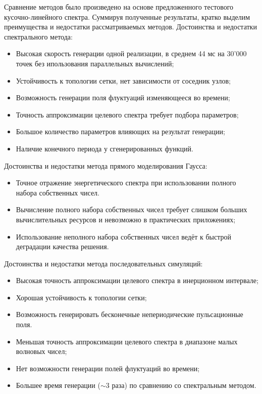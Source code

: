 Сравнение методов было произведено на основе предложенного тестового кусочно-линейного спектра.
Суммируя полученные результаты, кратко выделим преимущества и недостатки рассматриваемых методов.
\newline
Достоинства и недостатки спектрального метода:
\begin{itemize}[label=+]
    \item Высокая скорость генерации одной реализации, в среднем 44 мс на 30'000 точек без ипользования параллельных вычислений;
    \item Устойчивость к топологии сетки, нет зависимости от соседник узлов;
    \item Возможность генерации поля флуктуаций изменяющееся во времени;
\end{itemize}
\begin{itemize}[label=--]
    \item Точность аппроксимации целевого спектра требует подбора параметров;
    \item Большое количество параметров влияющих на результат генерации;
    \item Наличие конечного периода у сгенерированных функций.
\end{itemize}
Достоинства и недостатки метода прямого моделирования Гаусса:
\begin{itemize}[label=+]
    \item Точное отражение энергетического спектра при использовании полного набора собственных чисел.
\end{itemize}
\begin{itemize}[label=--]
    \item Вычисление полного набора собственных чисел требует слишком больших вычислительных ресурсов и невозможно в практических приложениях;
    \item Использование неполного набора собственных чисел ведёт к быстрой деградации качества решения.
\end{itemize}
Достоинства и недостатки метода последовательных симуляций:
\begin{itemize}[label=+]
    \item Высокая точность аппроксимации целевого спектра в инерционном интервале;
    \item Хорошая устойчивость к топологии сетки;
    \item Возможность генерировать бесконечные непериодические пульсационные поля.
\end{itemize}
\begin{itemize}[label=--]
    \item Меньшая точность аппроксимации целевого спектра в диапазоне малых волновых чисел;
    \item Нет возможности генерации полей флуктуаций во времени;
    \item Большее время генерации ($\sim$3 раза) по сравнению со спектральным методом.
\end{itemize}

